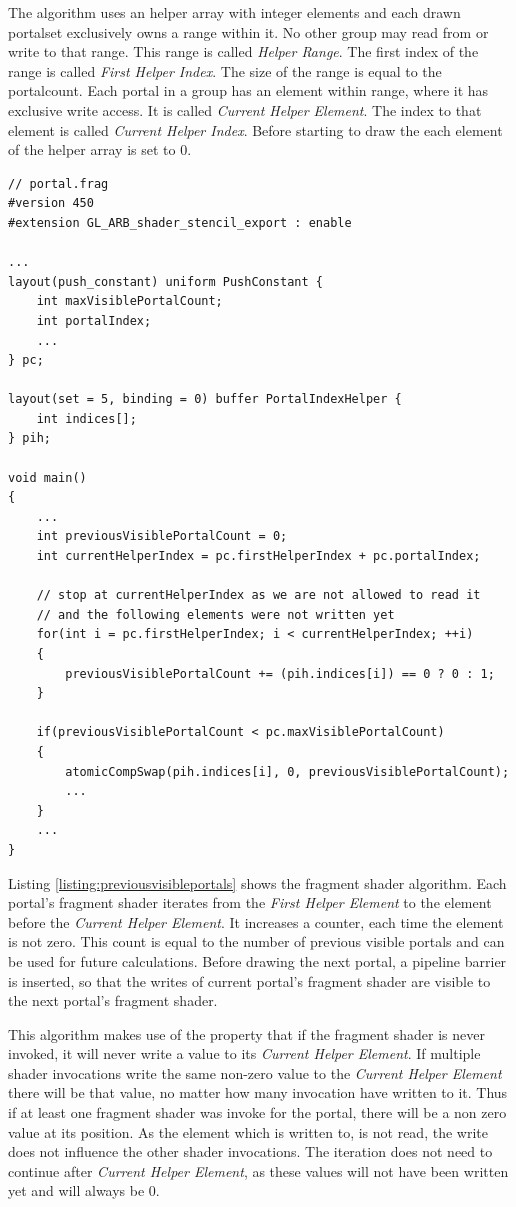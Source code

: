 The algorithm uses an helper array with integer elements and each drawn \gls{portalset} exclusively owns a range within it. No other group may read from or write to that range. This range is called \textit{Helper Range}. The first index of the range is called \textit{First Helper Index}. The size of the range is equal to the \gls{portalcount}. Each portal in a group has an element within range, where it has exclusive write access. It is called \textit{Current Helper Element}. The index to that element is called \textit{Current Helper Index}. Before starting to draw the each element of the helper array is set to 0.

\begin{lstlisting}[caption={Calculate Previous Visible Portals}, label=listing:previousvisibleportals]
// portal.frag
#version 450
#extension GL_ARB_shader_stencil_export : enable

...
layout(push_constant) uniform PushConstant {	
	int maxVisiblePortalCount;
	int portalIndex;
	...
} pc;

layout(set = 5, binding = 0) buffer PortalIndexHelper {
	int indices[];
} pih;

void main()
{
	...
	int previousVisiblePortalCount = 0;
	int currentHelperIndex = pc.firstHelperIndex + pc.portalIndex;
	
	// stop at currentHelperIndex as we are not allowed to read it
	// and the following elements were not written yet
	for(int i = pc.firstHelperIndex; i < currentHelperIndex; ++i)
	{
		previousVisiblePortalCount += (pih.indices[i]) == 0 ? 0 : 1;
	}
	
	if(previousVisiblePortalCount < pc.maxVisiblePortalCount)
	{
		atomicCompSwap(pih.indices[i], 0, previousVisiblePortalCount);
		...
	}
	...
}
\end{lstlisting}

Listing \ref{listing:previousvisibleportals} shows the fragment shader algorithm. Each portal's fragment shader iterates from the \textit{First Helper Element} to the element before the \textit{Current Helper Element}. It increases a counter, each time the element is not zero. This count is equal to the number of previous visible portals and can be used for future calculations. Before drawing the next portal, a pipeline barrier is inserted, so that the writes of current portal's fragment shader are visible to the next portal's fragment shader.

This algorithm makes use of the property that if the fragment shader is never invoked, it will never write a value to its \textit{Current Helper Element}. If multiple shader invocations write the same non-zero value to the \textit{Current Helper Element} there will be that value, no matter how many invocation have written to it.
Thus if at least one fragment shader was invoke for the portal, there will be a non zero value at its position. As the element which is written to, is not read, the write does not influence the other shader invocations. The iteration does not need to continue after \textit{Current Helper Element}, as these values will not have been written yet and will always be 0.

